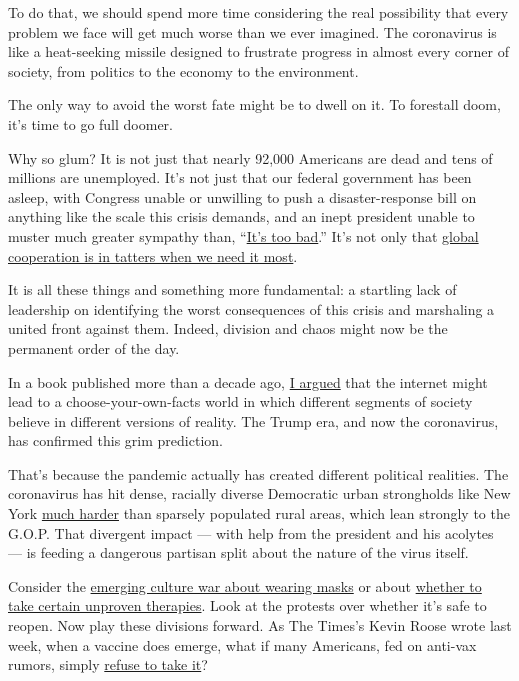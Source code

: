 To do that, we should spend more time considering the real possibility
that every problem we face will get much worse than we ever imagined.
The coronavirus is like a heat-seeking missile designed to frustrate
progress in almost every corner of society, from politics to the economy
to the environment.

The only way to avoid the worst fate might be to dwell on it. To
forestall doom, it's time to go full doomer.

Why so glum? It is not just that nearly 92,000 Americans are dead and
tens of millions are unemployed. It's not just that our federal
government has been asleep, with Congress unable or unwilling to push a
disaster-response bill on anything like the scale this crisis demands,
and an inept president unable to muster much greater sympathy than,
``\href{https://twitter.com/atrupar/status/1262769806639587329?s=21}{It's
too bad}.'' It's not only that
\href{https://www.nytimes3xbfgragh.onion/2020/05/19/us/coronavirus-updates.html\#link-1fe21236}{global
cooperation is in tatters when we need it most}.

It is all these things and something more fundamental: a startling lack
of leadership on identifying the worst consequences of this crisis and
marshaling a united front against them. Indeed, division and chaos might
now be the permanent order of the day.

In a book published more than a decade ago,
\href{https://www.nytimes3xbfgragh.onion/2016/11/03/technology/how-the-internet-is-loosening-our-grip-on-the-truth.html}{I
argued} that the internet might lead to a choose-your-own-facts world in
which different segments of society believe in different versions of
reality. The Trump era, and now the coronavirus, has confirmed this grim
prediction.

That's because the pandemic actually has created different political
realities. The coronavirus has hit dense, racially diverse Democratic
urban strongholds like New York
\href{https://www.npr.org/2020/04/12/832455226/what-coronavirus-exposes-about-americas-political-divide}{much
harder} than sparsely populated rural areas, which lean strongly to the
G.O.P. That divergent impact --- with help from the president and his
acolytes --- is feeding a dangerous partisan split about the nature of
the virus itself.

Consider the
\href{https://www.vox.com/2020/5/13/21257181/coronavirus-masks-trump-republicans-culture-war}{emerging
culture war about wearing masks} or about
\href{https://www.nytimes3xbfgragh.onion/2020/04/22/business/media/virus-fox-news-hydroxychloroquine.html}{whether
to take certain unproven therapies}. Look at the protests over whether
it's safe to reopen. Now play these divisions forward. As The Times's
Kevin Roose wrote last week, when a vaccine does emerge, what if many
Americans, fed on anti-vax rumors, simply
\href{https://www.nytimes3xbfgragh.onion/2020/05/13/technology/coronavirus-vaccine-disinformation.html}{refuse
to take it}?

